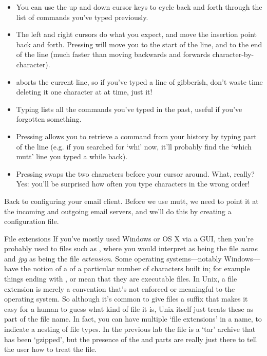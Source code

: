 \begin{itemize}
\item You can use the up and down cursor keys to cycle back and forth through the list of commands you've typed previously.
\item The left and right cursors do what you expect, and move the insertion point back and forth. Pressing  will move you to the start of the line, and  to the end of the line (much faster than moving backwards and forwards character-by-character). 
\item {} aborts the current line, so if you've typed a line of gibberish, don't waste time deleting it one character at at time, just  it!
\item Typing  lists all the commands you've typed in the past, useful if you've forgotten something.
\item Pressing  allows you to retrieve a command from your history by typing part of the line (e.g. if you searched for `whi' now, it'll probably find the `which mutt' line you typed a while back). 
\item Pressing  swaps the two characters before your cursor around. What, really? Yes: you'll be surprised how often you type characters in the wrong order! 
\end{itemize}

Back to configuring your email client. Before we use mutt, we need to point it at the incoming and outgoing email servers, and we'll do this by creating a configuration file.

\begin{diversion}{File extensions}
\label{diversion:file-extensions}
If you've mostly used Windows or OS X via a GUI, then you're probably used to files such as , where you would interpret  as being the file \textit{name} and \textit{jpg} as being the file \textit{extension}. Some operating systems---notably Windows---have the notion of a  of a particular number of characters built in; for example things ending with ,  or  mean that they are executable files. In Unix, a file extension is merely a convention that's not enforced or meaningful to the operating system. So although it's common to give files a suffix that makes it easy for a human to guess what kind of file it is, Unix itself just treats these as part of the file name. In fact, you can have multiple `file extensions' in a name, to indicate a nesting of file types. In the previous lab the file  is a `tar' archive that has been `gzipped', but the presence of the  and  parts are really just there to tell the user how to treat the file.
\end{diversion}

